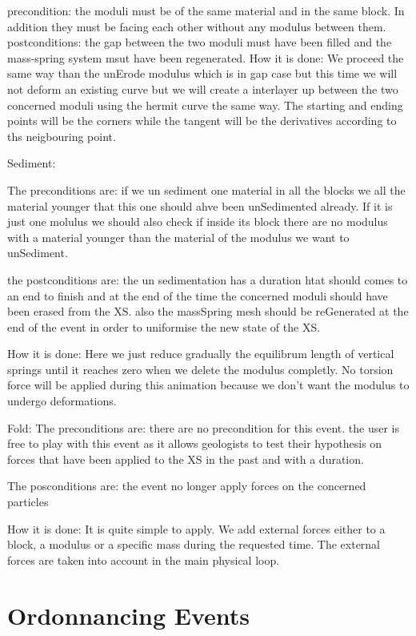 \documentclass[12pt, a4paper]{memoir} %
\begin{document}
		precondition: the moduli must be of the same material and in the same block. In addition they must be facing each other without any modulus between them. 
		postconditions: the gap between the two moduli must have been filled and the mass-spring system msut have been regenerated.
		How it is done: We proceed the same way than the unErode modulus which is in gap case but this time we will not deform an existing curve but we will create a interlayer up between the two concerned moduli using the hermit curve the same way. The starting and ending points will be the corners while the tangent will be the derivatives according to ths neigbouring point.
		

Sediment:

	The preconditions are: if we un sediment one material in all the blocks
	we all the material younger that this one should ahve been unSedimented already. If it is just one molulus we should also check if inside its block there are  no modulus with a material younger than the material of the modulus we want to unSediment.
	
	the postconditions are: the un sedimentation has a duration htat should comes to an end to finish and at the end of the time the concerned moduli should have been erased from the XS. also the massSpring mesh should be reGenerated at the end of the event in order to uniformise the new state of the XS.
	
	How it is done: Here we just reduce gradually the equilibrum length of vertical springs until it reaches zero when we delete the modulus completly. No torsion force will be applied during this animation because we don't want the modulus to undergo deformations.

Fold:
	The preconditions are: there are no precondition for this event. the user is free to play with this event as it allows geologists to test their hypothesis on forces that have been applied to the XS in the past and with a duration.
	
	The posconditions are: the event no longer apply forces on the concerned particles
	
	How it is done: It is quite simple to apply. We add external forces either to a block, a modulus or a specific mass during the requested time. The external forces are taken into account in the main physical loop.
	

\section{Ordonnancing Events}
\end{document}
